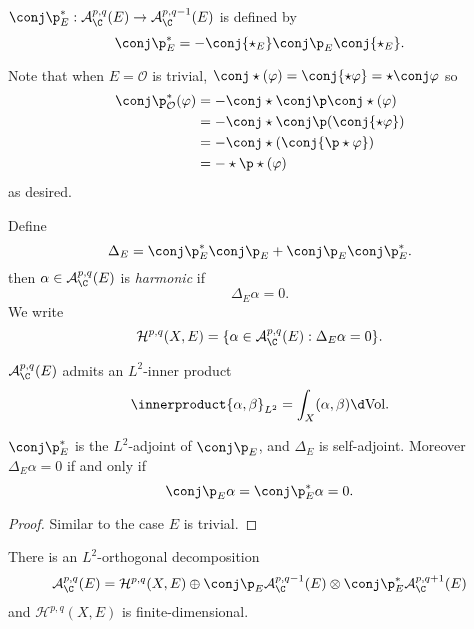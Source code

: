 \documentclass[a4paper]{article}
\newcommand*{\ip}{\innerproduct}
\begin{document}
\begin{definition}
  \(\conj \p_E^*: \mathcal A^{p, q}_\C(E) \to \mathcal A^{p, q - 1}_\C(E)\) is defined by
  \[
    \conj \p_E^* = - \conj{\star_E} \conj \p_E \conj{\star_E}.
  \]
\end{definition}

Note that when \(E = \mathcal O\) is trivial, \(\conj \star(\varphi) = \conj{\star \varphi} = \star \conj \varphi\) so
\begin{align*}
  \conj \p_{\mathcal O}^*(\varphi)
  &= - \conj \star \conj \p \conj \star (\varphi) \\
  &= - \conj \star \conj \p (\conj{\star \varphi}) \\
  &= - \conj \star (\conj{\p \star \varphi}) \\
  &= - \star \p \star (\varphi)
\end{align*}
as desired.

\begin{definition}
  Define
  \[
    \Delta_E = \conj \p_E^* \conj \p_E + \conj \p_E \conj \p^*_E.
  \]
  then \(\alpha \in \mathcal A^{p, q}_\C(E)\) is \emph{harmonic} if
  \[
    \Delta_E\alpha = 0.
  \]
  We write
  \[
    \mathcal H^{p, q}(X, E) = \{\alpha \in \mathcal A^{p, q}_\C(E): \Delta_E\alpha = 0\}.
  \]
\end{definition}

\(\mathcal A^{p, q}_\C(E)\) admits an \(L^2\)-inner product
\[
  \ip{\alpha, \beta}_{L^2} = \int_X (\alpha, \beta) \d \text{Vol}.
\]

\begin{lemma}
  \(\conj \p_E^*\) is the \(L^2\)-adjoint of \(\conj \p_E\), and \(\Delta_E\) is self-adjoint. Moreover \(\Delta_E\alpha = 0\) if and only if
  \[
    \conj \p_E \alpha = \conj \p_E^* \alpha = 0.
  \]
\end{lemma}

\begin{proof}
  Similar to the case \(E\) is trivial.
\end{proof}

\begin{theorem}
  There is an \(L^2\)-orthogonal decomposition
  \[
    \mathcal A^{p, q}_\C(E) = \mathcal H^{p, q}(X, E) \oplus \conj \p_E \mathcal A^{p, q - 1}_\C(E) \otimes \conj \p_E^* \mathcal A^{p, q + 1}_\C(E)
  \]
  and \(\mathcal H^{p, q}(X, E)\) is finite-dimensional.
\end{theorem}
\end{document}
